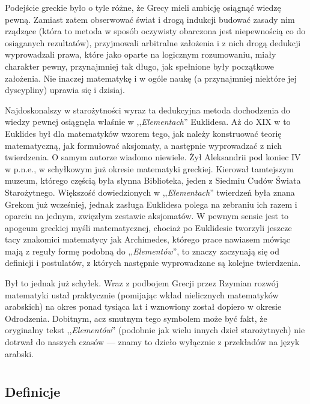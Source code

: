 \documentclass[12pt, a4paper]{scrartcl}
\begin{document}
Podejście greckie było o tyle różne, że Grecy mieli ambicję osiągnąć wiedzę
pewną. Zamiast zatem obserwować świat i drogą indukcji budować zasady
nim rządzące (która to metoda w sposób oczywisty obarczona jest niepewnością
co do osiąganych rezultatów), przyjmowali arbitralne założenia i z nich drogą
dedukcji wyprowadzali prawa, które jako oparte na logicznym rozumowaniu, miały
charakter pewny, przynajmniej tak długo, jak spełnione były początkowe
założenia. Nie inaczej matematykę i w ogóle naukę (a przynajmniej niektóre jej
dyscypliny) uprawia się i dzisiaj.

Najdoskonalszy w starożytności wyraz ta dedukcyjna metoda dochodzenia do wiedzy
pewnej osiągnęła właśnie w ,,\emph{Elementach}'' Euklidesa. Aż do XIX w to
Euklides był dla matematyków wzorem tego, jak należy konstruować teorię
matematyczną, jak formułować aksjomaty, a następnie wyprowadzać z nich
twierdzenia. O samym autorze wiadomo niewiele. Żył Aleksandrii pod koniec IV w
p.n.e., w schyłkowym już okresie matematyki greckiej. Kierował tamtejszym
muzeum, którego częścią była słynna Biblioteka, jeden z Siedmiu Cudów Świata
Starożytnego. Większość dowiedzionych w ,,\emph{Elementach}'' twierdzeń była
znana Grekom już wcześniej, jednak zasługa Euklidesa polega na zebraniu ich
razem i oparciu na jednym, zwięzłym zestawie aksjomatów. W pewnym sensie jest to
apogeum greckiej myśli matematycznej, chociaż po Euklidesie tworzyli jeszcze
tacy znakomici matematycy jak Archimedes, którego prace nawiasem mówiąc mają z
reguły formę podobną do ,,\emph{Elementów}'', to znaczy zaczynają się od
definicji i postulatów, z których następnie wyprowadzane są kolejne twierdzenia.

Był to jednak już schyłek. Wraz z podbojem Grecji przez Rzymian rozwój
matematyki ustał praktycznie (pomijając wkład nielicznych matematyków arabskich)
na okres ponad tysiąca lat i wznowiony został dopiero w okresie Odrodzenia.
Dobitnym, acz smutnym tego symbolem może być fakt, że oryginalny tekst
,,\emph{Elementów}'' (podobnie jak wielu innych dzieł starożytnych) nie dotrwał
do naszych czasów --- znamy to dzieło wyłącznie z przekładów na język arabski.

\pagebreak

\section{}
\subsection*{Definicje}
\end{document}
